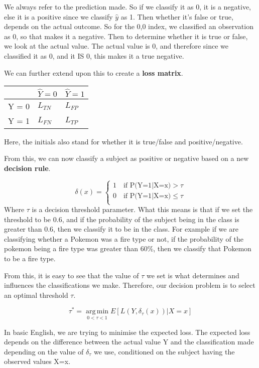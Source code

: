 \documentclass[11pt, oneside]{article}
\theoremstyle{definition}
\DeclareMathOperator*{\argmin}{arg\,min}
\begin{document}
We always refer to the prediction made. So if we classify it as 0, it is a negative, else it is a positive since we classify $\hat{y}$ as 1. Then whether it's false or true, depends on the actual outcome. So for the 0,0 index, we classified an observation as 0, so that makes it a negative. Then to determine whether it is true or false, we look at the actual value. The actual value is 0, and therefore since we classified it as 0, and it IS 0, this makes it a true negative.

We can further extend upon this to create a \textbf{loss matrix}.

\begin{center}
\begin{tabu} to 0.8\textwidth { | X[l] | X[c] | X[r] | }
 \hline
  & $\hat{Y} = 0$  & $\hat{Y} = 1$ \\
 \hline
 Y = 0  & $L_{TN}$  & $L_{FP}$ \\
\hline
 Y = 1  & $L_{FN}$  & $L_{TP}$  \\
\hline
\end{tabu}
\end{center}

Here, the initials also stand for whether it is true/false and positive/negative.

From this, we can now classify a subject as positive or negative based on a new \textbf{decision rule}.

\[
\delta(x) = \left\{
\begin{array}{ll}
      1  \quad \textrm{if P(Y=1$|$X=x)} > \tau \\
      0  \quad \textrm{if P(Y=1$|$X=x)} \leq \tau\\
\end{array}
\right.
\]
Where $\tau$ is a decision threshold parameter. What this means is that if we set the threshold to be 0.6, and if the probability of the subject being in the class is greater than 0.6, then we classify it to be in the class. For example if we are classifying whether a Pokemon was a fire type or not, if the probability of the pokemon being a fire type was greater than 60\%, then we classify that Pokemon to be a fire type.

From this, it is easy to see that the value of $\tau$ we set is what determines and influences the classifications we make. Therefore, our decision problem is to select an optimal threshold $\tau$.

$$
\tau^{*} = \argmin\limits_{0 < \tau < 1} E[L(Y,\delta_{\tau}(x))|X=x]
$$

In basic English, we are trying to minimise the expected loss. The expected loss depends on the difference between the actual value Y and the classification made depending on the value of $\delta_{\tau}$ we use, conditioned on the subject having the observed values X=x.
\end{document}
